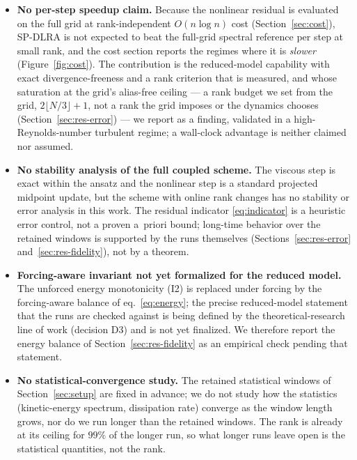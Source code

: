 \begin{itemize}
  \item \textbf{No per-step speedup claim.} Because the nonlinear residual
  is evaluated on the full grid at rank-independent $O(n \log n)$ cost
  (Section~\ref{sec:cost}), SP-DLRA is not expected to beat the full-grid
  spectral reference per step at small rank, and the cost section reports
  the regimes where it is \emph{slower} (Figure~\ref{fig:cost}). The
  contribution is the reduced-model capability with exact
  divergence-freeness and a rank criterion that is measured, and whose
  saturation at the grid's alias-free ceiling --- a rank budget we set from the
  grid, $2\lfloor N/3\rfloor+1$, not a rank the grid imposes or the dynamics chooses
  (Section~\ref{sec:res-error}) --- we report as a finding,
  validated in a high-Reynolds-number turbulent regime; a wall-clock
  advantage is
  neither claimed nor assumed.

  \item \textbf{No stability analysis of the full coupled scheme.} The
  viscous step is exact within the ansatz and the nonlinear step is a
  standard projected midpoint update, but the scheme with online rank
  changes has no stability or error analysis in this work. The residual
  indicator \eqref{eq:indicator} is a heuristic error control, not a proven
  a~priori bound; long-time behavior over the retained windows is supported
  by the runs themselves (Sections~\ref{sec:res-error}
  and~\ref{sec:res-fidelity}), not by a theorem.

  \item \textbf{Forcing-aware invariant not yet formalized for the reduced
  model.} The unforced energy monotonicity (I2) is replaced under forcing by
  the forcing-aware balance of eq.~\eqref{eq:energy}; the precise
  reduced-model statement that the runs are checked against is being
  defined by the theoretical-research line of work (decision D3) and is not
  yet finalized. We therefore report the energy balance of
  Section~\ref{sec:res-fidelity} as an empirical check pending that
  statement.

  \item \textbf{No statistical-convergence study.} The retained statistical
  windows of Section~\ref{sec:setup} are fixed in advance; we do not study
  how the statistics (kinetic-energy spectrum, dissipation rate) converge as
  the window length grows, nor do we run longer than the retained windows.
  The rank is already at its ceiling for $99\%$ of the longer run, so what
  longer runs leave open is the statistical quantities, not the rank.
\end{itemize}
